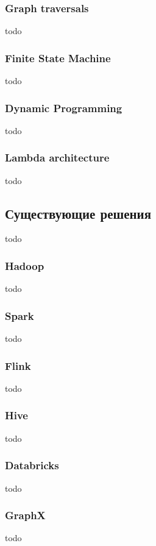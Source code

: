 \subsubsection{Graph traversals}
todo
\subsubsection{Finite State Machine}
todo
\subsubsection{Dynamic Programming}
todo
\subsubsection{Lambda architecture}
todo

\subsection{Существующие решения}
todo
\subsubsection{Hadoop}
todo
\subsubsection{Spark}
todo
\subsubsection{Flink}
todo
\subsubsection{Hive}
todo
\subsubsection{Databricks}
todo
\subsubsection{GraphX}
todo

